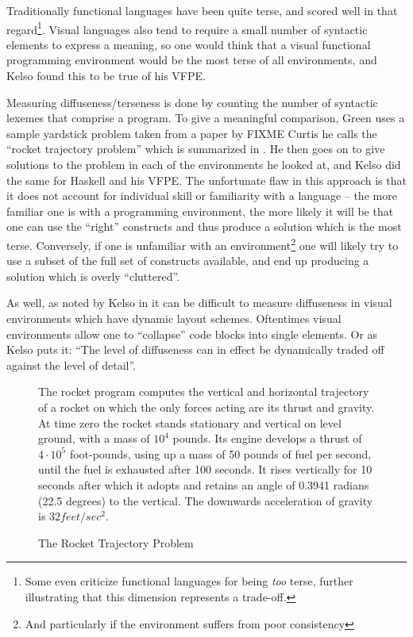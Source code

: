 Traditionally functional languages have been quite terse, and scored well in that regard\footnote{Some even criticize functional languages for being \emph{too} terse, further illustrating that this dimension represents a trade-off.}.  Visual languages also tend to require a small number of syntactic elements to express a meaning, so one would think that a visual functional programming environment would be the most terse of all environments, and Kelso found this to be true of his VFPE\cite{Kelso02}.

Measuring diffuseness/terseness is done by counting the number of syntactic lexemes that comprise a program.  To give a meaningful comparison, Green uses a sample yardstick problem taken from a paper by FIXME Curtis he calls the ``rocket trajectory problem'' which is summarized in .  He then goes on to give solutions to the problem in each of the environments he looked at, and Kelso did the same for Haskell and his VFPE.  The unfortunate flaw in this approach is that it does not account for individual skill or familiarity with a language -- the more familiar one is with a programming environment, the more likely it will be that one can use the ``right'' constructs and thus produce a solution which is the most terse.  Conversely, if one is unfamiliar with an environment\footnote{And particularly if the environment suffers from poor consistency} one will likely try to use a subset of the full set of constructs available, and end up producing a solution which is overly ``cluttered''.

As well, as noted by Kelso in \cite{Kelso02} it can be difficult to measure diffuseness in visual environments which have dynamic layout schemes.  Oftentimes visual environments allow one to ``collapse'' code blocks into single elements.  Or as Kelso puts it: ``The level of diffuseness can in effect be dynamically traded off against the level of detail''.

\begin{figure}
The rocket program computes the vertical and horizontal trajectory of a rocket on which the only forces acting are its thrust and gravity.  At time zero the rocket stands stationary and vertical on level ground, with a mass of $10^4$ pounds.  Its engine develops a thrust of $4\cdot10^5$ foot-pounds, using up a mass of 50 pounds of fuel per second, until the fuel is exhausted after 100 seconds.  It rises vertically for 10 seconds after which it adopts and retains an angle of 0.3941 radians (22.5 degrees) to the vertical.  The downwards acceleration of gravity is $32 feet/sec^2$.\cite{green96}
  \caption{The Rocket Trajectory Problem}
  \label{fig:rocketTrajectoryProblem}
\end{figure}

